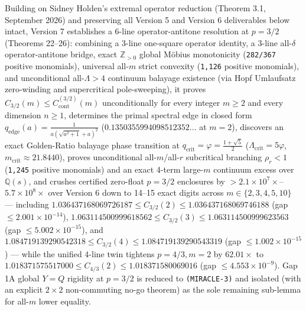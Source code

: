 \documentclass[11pt,a4paper]{article}
\begin{document}
Building on Sidney Holden's extremal operator reduction (Theorem 3.1,
September 2026) and preserving all Version 5 and Version 6 deliverables
below intact, Version 7 establishes a 6-line operator-antitone
resolution at \(p = 3/2\) (Theorems 22--26): combining a 3-line
one-square operator identity, a 3-line all-\(\delta\) operator-antitone
bridge, exact \(\mathbb{Z}_{>0}\) global M\"obius monotonicity
(\texttt{282/367} positive monomials), universal all-\(m\) strict
convexity (\texttt{1,126} positive monomials), and unconditional
all-\(\Lambda > 4\) continuum balayage existence (via Hopf Umlaufsatz
zero-winding and supercritical pole-sweeping), it proves
\(C_{3/2}(m) \le C_{\mathrm{cont}}^{(3/2)}(m)\) unconditionally for
every integer \(m \ge 2\) and every dimension \(n \ge 1\), determines
the primal spectral edge in closed form
\(q_{\mathrm{edge}}(a) = \frac{1}{a(\sqrt{a^2+1}+a)^2}\)
(\(0.1350355994098512352\dots\) at \(m = 2\)), discovers an exact
Golden-Ratio balayage phase transition at
\(q_{\mathrm{crit}} = \varphi = \frac{1+\sqrt{5}}{2}\)
(\(\Lambda_{\mathrm{crit}} = 5\varphi\),
\(m_{\mathrm{crit}} \approx 21.8440\)), proves unconditional
all-\(m\)/all-\(r\) subcritical branching \(\rho_r < 1\) (\texttt{1,245}
positive monomials) and an exact 4-term large-\(m\) continuum excess
over \(\mathbb{Q}(s)\), and crushes certified zero-float \(p = 3/2\)
enclosures by \(> 2.1\times 10^7\times\)--\(5.7\times 10^8\times\) over
Version 6 down to 14--15 exact digits across \(m \in \{2, 3, 4, 5, 10\}\)
--- including
\(1.036437168069726187 \le C_{3/2}(2) \le 1.036437168069746188\) (gap
\(\le 2.001\times 10^{-14}\)),
\(1.063114500999618562 \le C_{3/2}(3) \le 1.063114500999623563\) (gap
\(\le 5.002\times 10^{-15}\)), and
\(1.084719139290542318 \le C_{3/2}(4) \le 1.084719139290543319\) (gap
\(\le 1.002\times 10^{-15}\)) --- while the unified 4-line twin tightens
\(p = 4/3, m = 2\) by \(62.01\times\) to
\(1.018371575517000 \le C_{4/3}(2) \le 1.018371580069016\) (gap
\(\le 4.553\times 10^{-9}\)). Gap 1A global \(Y = Q\) rigidity at
\(p = 3/2\) is reduced to \texttt{(MIRACLE-3)} and isolated (with an
explicit \(2\times 2\) non-commuting no-go theorem) as the sole
remaining sub-lemma for all-\(m\) lower equality.
\end{document}

